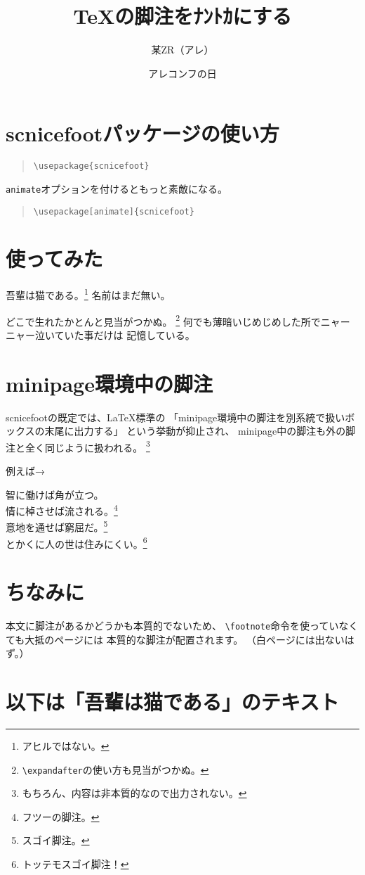 \documentclass[uplatex,dvipdfmx,a4paper]{jsarticle}
\title{{\TeX}の脚注をﾅﾝﾄｶにする}
\author{某ZR（アレ）}
\date{アレコンフの日}
\newcommand{\Pkg}[1]{\textsf{#1}}
\begin{document}
\maketitle
\section{\Pkg{scnicefoot}パッケージの使い方}

\begin{quote}\small\begin{verbatim}
\usepackage{scnicefoot}
\end{verbatim}\end{quote}

\verb|animate|オプションを付けるともっと素敵になる。
\begin{quote}\small\begin{verbatim}
\usepackage[animate]{scnicefoot}
\end{verbatim}\end{quote}

\section{使ってみた}

吾輩は猫である。\footnote{アヒルではない。}%
名前はまだ無い。%

どこで生れたかとんと見当がつかぬ。%
\footnote{\verb|\expandafter|の使い方も見当がつかぬ。}%
何でも薄暗いじめじめした所でニャーニャー泣いていた事だけは
記憶している。

\section{minipage環境中の脚注}

\Pkg{scnicefoot}の既定では、{\LaTeX}標準の
「minipage環境中の脚注を別系統で扱いボックスの末尾に出力する」
という挙動が抑止され、
minipage中の脚注も外の脚注と全く同じように扱われる。
\footnote{もちろん、内容は非本質的なので出力されない。}

例えば→
\begin{minipage}{15zw}
智に働けば角が立つ。\\
情に棹させば流される。\footnote{フツーの脚注。}\\
意地を通せば窮屈だ。\footnote{スゴイ脚注。}\\
とかくに人の世は住みにくい。\footnote{トッテモスゴイ脚注！}
\end{minipage}

\section{ちなみに}
本文に脚注があるかどうかも本質的でないため、
\verb|\footnote|命令を使っていなくても大抵のページには
本質的な脚注が配置されます。
（白ページには出ないはず。）

\section{以下は「吾輩は猫である」のテキスト}

\end{document}
